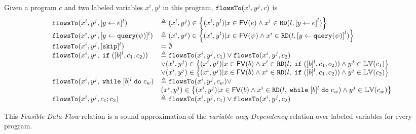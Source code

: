 \begin{defn}
 \label{def:feasible_flowsto}
 Given a program $c$ and two labeled variables $x^i, y^j$ in this program, 
 $\mathtt{flowsTo}(x^i, y^j, c)$ is 
 {\small
 \[
 \begin{array}{ll}
 \flowsto(x^i, y^j, \clabel{\assign{y}{\expr}}{}^l) 
 & \triangleq (x^i, y^j) \in \left\{ (x^i, y^l) | x \in \mathsf{FV}(\expr) 
 \land x^i \in \live(l, \clabel{\assign{y}{\expr}}^l) \right\} \\
 \flowsto(x^i, y^j, \clabel{\assign{y}{\query(\qexpr)}}{}^l) 
 & \triangleq (x^i, y^j) \in \left\{ (x^i, y^l) | x \in \mathsf{FV}(\qexpr) 
 \land x^i \in \live(l,\clabel{\assign{y}{\query(\qexpr)}}^l) \right\} \\
 \flowsto(x^i, y^j, [\eskip]^{l}) & = \emptyset \\
 \flowsto(x^i, y^j, \eif ([b]^l, c_1, c_2)) & \triangleq \flowsto(x^i, y^j, c_1) \lor \flowsto(x^i, y^j, c_2) \\ 
 & \lor (x^i, y^j) \in
 \left\{(x^i,y^j) | x \in \mathsf{FV}(b) \land 
 x^i \in \live(l, \eif ([b]^l, c_1, c_2)) \land y^j \in \lvar(c_1) \right\} \\
 &\lor (x^i, y^j) \in \left\{(x^i,y^j) | x \in \mathsf{FV}(b) \land 
 x^i\in \live(l, \eif ([b]^l, c_1, c_2)) \land y^j \in \lvar(c_2) \right\} \\
 \flowsto(x^i, y^j, \ewhile [b]^l \edo c_w) & \triangleq \flowsto(x^i, y^j, c_w) \lor
 \\ & 
 (x^i, y^j) \in \left\{(x^i,y^j) | x \in \mathsf{FV}(b) \land 
 x^i \in \live(l, \ewhile [b]^l \edo c_w) \land y^j \in \lvar(c_w) \right\} \\
 \flowsto(x^i, y^j, c_1 ;c_2) & \triangleq \flowsto(x^i, y^j, c_1) \lor \flowsto(x^i, y^j, c_2) \\
 \end{array}
 \]
 }
 \end{defn}
%
This \emph{Feasible Data-Flow} relation is a sound approximation 
of the \emph{variable may-Dependency} relation over labeled variables for every program.
